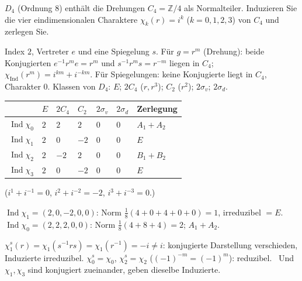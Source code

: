 \begin{aufgabe}
$D_4$ (Ordnung $8$) enthält die Drehungen $C_4 = \mathbb Z/4$ als Normalteiler. Induzieren Sie die vier eindimensionalen Charaktere $\chi_k(r) = i^{k}$ ($k = 0, 1, 2, 3$) von $C_4$ und zerlegen Sie.

\loesung
{}
Index $2$, Vertreter $e$ und eine Spiegelung $s$. Für $g = r^{m}$ (Drehung): beide Konjugierten $e^{-1}r^{m}e = r^{m}$ und $s^{-1}r^{m}s = r^{-m}$ liegen in $C_4$; $\chi_{\operatorname{Ind}}(r^{m}) = i^{km} + i^{-km}$. Für Spiegelungen: keine Konjugierte liegt in $C_4$, Charakter $0$.
Klassen von $D_4$: $E$; $2C_4$ ($r, r^{3}$); $C_2$ ($r^{2}$); $2\sigma_v$; $2\sigma_d$.
\begin{center}
{\small
\renewcommand{\arraystretch}{1.46}
\begin{tabular}{@{}P{1.6cm}P{0.7cm}P{0.9cm}P{0.8cm}P{0.9cm}P{0.9cm}P{2.4cm}@{}}
\toprule
 & $E$ & $2C_4$ & $C_2$ & $2\sigma_v$ & $2\sigma_d$ & \textbf{Zerlegung}\\
\midrule
$\operatorname{Ind}\chi_0$ & $2$ & $2$ & $2$ & $0$ & $0$ & $A_1 + A_2$\\
$\operatorname{Ind}\chi_1$ & $2$ & $0$ & $-2$ & $0$ & $0$ & $E$\\
$\operatorname{Ind}\chi_2$ & $2$ & $-2$ & $2$ & $0$ & $0$ & $B_1 + B_2$\\
$\operatorname{Ind}\chi_3$ & $2$ & $0$ & $-2$ & $0$ & $0$ & $E$\\
\bottomrule
\end{tabular}}
\end{center}
($i^{1} + i^{-1} = 0$, $i^{2} + i^{-2} = -2$, $i^{3} + i^{-3} = 0$.)

$\operatorname{Ind}\chi_1 = (2, 0, -2, 0, 0)$: Norm $\frac18(4 + 0 + 4 + 0 + 0) = 1$, irreduzibel $= E$. \checkmark\ $\operatorname{Ind}\chi_0 = (2, 2, 2, 0, 0)$: Norm $\frac18(4 + 8 + 4) = 2$; $A_1 + A_2$. \checkmark

$\chi_1^{s}(r) = \chi_1(s^{-1}rs) = \chi_1(r^{-1}) = -i\neq i$: konjugierte Darstellung verschieden, Induzierte irreduzibel. $\chi_0^{s} = \chi_0$, $\chi_2^{s} = \chi_2$ ($(-1)^{-m} = (-1)^{m}$): reduzibel. \checkmark\ Und $\chi_1, \chi_3$ sind konjugiert zueinander, geben dieselbe Induzierte. \checkmark

\begin{center}
\begin{minipage}{0.88\textwidth}
\end{minipage}
\end{center}
\end{aufgabe}

